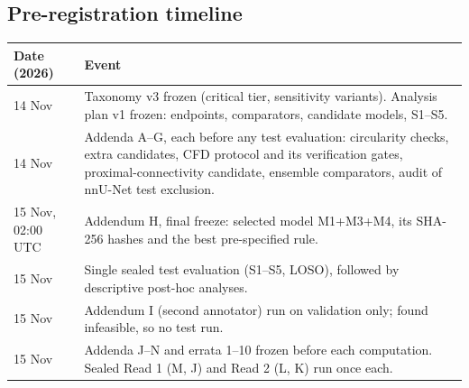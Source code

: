 \documentclass[11pt]{article}
\begin{document}
\clearpage
\begin{appendices}
\small
\section{Pre-registration timeline}
\label{app:timeline}
\begin{table}[h]
\centering
\small
\begin{tabularx}{\linewidth}{lX}
\toprule
Date (2026) & Event \\
\midrule
14 Nov & Taxonomy v3 frozen (critical tier, sensitivity variants). Analysis plan v1 frozen: endpoints, comparators, candidate models, S1--S5. \\
14 Nov & Addenda A--G, each before any test evaluation: circularity checks, extra candidates, CFD protocol and its verification gates, proximal-connectivity candidate, ensemble comparators, audit of nnU-Net test exclusion. \\
15 Nov, 02:00 UTC & Addendum H, final freeze: selected model M1+M3+M4, its SHA-256 hashes and the best pre-specified rule. \\
15 Nov & Single sealed test evaluation (S1--S5, LOSO), followed by descriptive post-hoc analyses. \\
15 Nov & Addendum I (second annotator) run on validation only; found infeasible, so no test run. \\
15 Nov & Addenda J--N and errata 1--10 frozen before each computation. Sealed Read 1 (M, J) and Read 2 (L, K) run once each. \\
\bottomrule
\end{tabularx}
\end{table}


\end{appendices}
\end{document}

